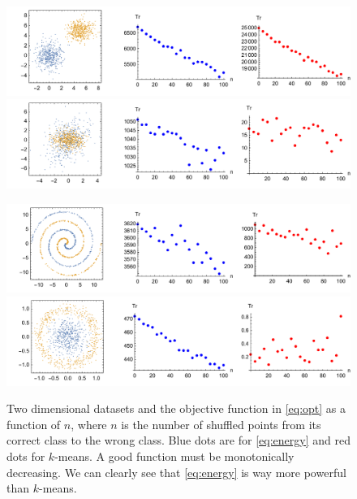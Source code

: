 \documentclass[simplex.tex]{subfiles}
\begin{document}
\begin{figure}[h!]
\begin{cframed}
\centering
\begin{minipage}{0.49\textwidth}
\includegraphics[scale=.37]{../../figs/plot1.pdf}
\includegraphics[scale=.37]{../../figs/plot2.pdf}
\end{minipage}
\begin{minipage}{0.49\textwidth}
\includegraphics[scale=.37]{../../figs/plot3.pdf}
\includegraphics[scale=.37]{../../figs/plot4.pdf}
\end{minipage}
\caption{
Two dimensional datasets and the objective function
in \ref{eq:opt} as a function of $n$, where $n$ is the number of shuffled
points from its correct class to the wrong class. Blue dots
are for \ref{eq:energy} and red dots for $k$-means. A good function must
be monotonically decreasing. We can clearly see that \ref{eq:energy} is
way more powerful than $k$-means.
}
\label{fig:plots}
\end{cframed}
\end{figure}
\end{document}
